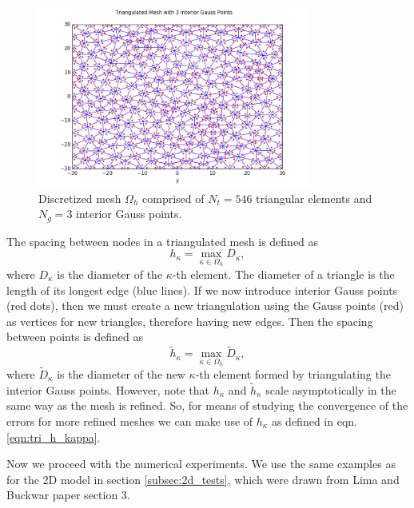 \documentclass{uonmathreport}
\begin{document}
\begin{figure}[H]
	\begin{center}
	\includegraphics[width=0.8\textwidth]{Figures/Mesh_With_3_Interior_Points.png}
	\end{center}
	\caption{Discretized mesh $\Omega_h$ comprised of $N_t=546$ triangular elements and $N_g=3$ interior Gauss points.}
	\label{fig:tri_mesh_3Gpoints}
\end{figure}
The spacing between nodes in a triangulated mesh is defined as
\begin{equation} \label{eqn:tri_h_kappa}
h_{\kappa} = \max_{\kappa \in \Omega_h} D_{\kappa},
\end{equation}
where $D_{\kappa}$ is the diameter of the $\kappa$-th element. The diameter of a triangle is the length of its longest edge (blue lines). If we now introduce interior Gauss points (red dots), then we must create a new triangulation using the Gauss points (red) as vertices for new triangles, therefore having new edges. Then the spacing between points is defined as 
\begin{equation}
\tilde{h}_{\kappa} = \max_{\kappa \in \Omega_h} \tilde{D}_{\kappa},
\end{equation}
where $\tilde{D}_{\kappa}$ is the diameter of the new $\kappa$-th element formed by triangulating the interior Gauss points. However, note that $h_{\kappa}$ and $\tilde{h}_{\kappa}$ scale asymptotically in the same way as the mesh is refined. So, for means of studying the convergence of the errors for more refined meshes we can make use of $h_{\kappa}$ as defined in eqn. \ref{eqn:tri_h_kappa}.

Now we proceed with the numerical experiments. We use the same examples as for the 2D model in section \ref{subsec:2d_tests}, which were drawn from Lima and Buckwar paper \cite{lima2015numerical} section 3.
\end{document}
